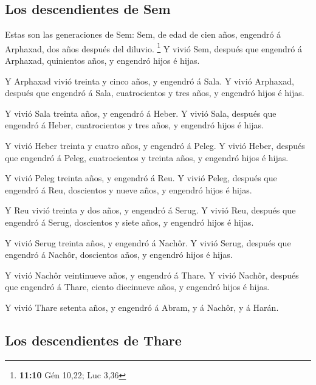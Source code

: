 \hypertarget{los-descendientes-de-sem}{%
\subsection{Los descendientes de Sem}\label{los-descendientes-de-sem}}

 Estas son las generaciones de Sem: Sem, de edad de cien
años, engendró á Arphaxad, dos años después del diluvio. \footnote{\textbf{11:10}
  Gén 10,22; Luc 3,36}  Y vivió Sem, después que engendró á
Arphaxad, quinientos años, y engendró hijos é hijas.

 Y Arphaxad vivió treinta y cinco años, y engendró á Sala.
 Y vivió Arphaxad, después que engendró á Sala,
cuatrocientos y tres años, y engendró hijos é hijas.

 Y vivió Sala treinta años, y engendró á Heber.
 Y vivió Sala, después que engendró á Heber, cuatrocientos
y tres años, y engendró hijos é hijas.

 Y vivió Heber treinta y cuatro años, y engendró á Peleg.
 Y vivió Heber, después que engendró á Peleg, cuatrocientos
y treinta años, y engendró hijos é hijas.

 Y vivió Peleg treinta años, y engendró á Reu.
 Y vivió Peleg, después que engendró á Reu, doscientos y
nueve años, y engendró hijos é hijas.

 Y Reu vivió treinta y dos años, y engendró á Serug.
 Y vivió Reu, después que engendró á Serug, doscientos y
siete años, y engendró hijos é hijas.

 Y vivió Serug treinta años, y engendró á Nachôr.
 Y vivió Serug, después que engendró á Nachôr, doscientos
años, y engendró hijos é hijas.

 Y vivió Nachôr veintinueve años, y engendró á Thare.
 Y vivió Nachôr, después que engendró á Thare, ciento
diecinueve años, y engendró hijos é hijas.

 Y vivió Thare setenta años, y engendró á Abram, y á
Nachôr, y á Harán.

\hypertarget{los-descendientes-de-thare}{%
\subsection{Los descendientes de
Thare}\label{los-descendientes-de-thare}}

